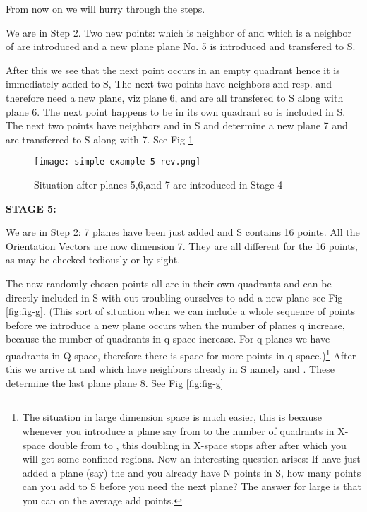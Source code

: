 \documentclass[english]{article}
\begin{document}
From now on we will hurry through the steps.

We are in Step 2. Two new points:  which is neighbor of  and
 which is a neighbor of  are introduced and a new
plane plane No. 5 is introduced and transfered to S.

After this we see that the next point  occurs in an empty quadrant
hence it is immediately added to S, The next two points 
have neighbors  and  resp. and therefore need a new plane, viz plane 6, and are all transfered to
S along with plane 6. The next point  happens to be in its
own quadrant so is included in S. The next two points 
have neighbors  and  in S and determine a new plane 7 and are transferred
to S along with 7. See Fig \ref{fig:fig-f}


\begin{figure}[htp]
 \begin{center}
 
\texttt{[image: simple-example-5-rev.png]}
\caption{Situation after planes 5,6,and 7 are introduced in Stage 4}

\label{fig:fig-f} \end{center}
\end{figure} 



\medskip{}
\medskip{}


\textbf{STAGE 5:}

We are in Step 2: 7 planes have been just added and S contains 16
points. All the Orientation Vectors are now dimension 7. They are
all different for the 16 points, as may be checked tediously or by
sight.

The new randomly chosen points 
all are in their own quadrants and can be directly included in S with
out troubling ourselves to add a new plane see Fig \ref{fig:fig-g}. (This sort of situation
when we can include a whole sequence of points before we introduce
a new plane occurs when the number of planes q increase, because
the number of quadrants in q space increase. For q planes we have
 quadrants in Q space, therefore there is space for more points
in q space.)\footnote{ The situation in large  dimension space is much easier, this is because whenever you introduce a plane say from  to  the number of quadrants in X-space double from  to , this doubling in X-space stops after  after which you will get some confined regions. Now an interesting question arises: If have just added a plane (say) the  and you already have N points in S, how many points can you add to S before you need the next plane? The answer for large  is that you can on the average add  points.}
 After this we arrive at  and  which
have neighbors already in S namely  and  . These determine
the last plane plane 8. See Fig \ref{fig:fig-g}
\end{document}
